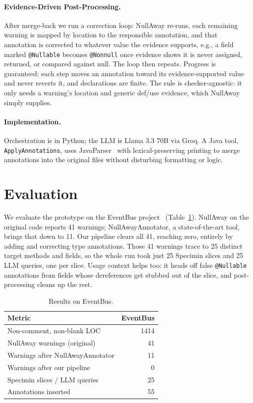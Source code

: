 \documentclass[sigplan,screen]{acmart}
\begin{document}
\paragraph{Evidence-Driven Post-Processing.}
After merge-back we run a correction loop: NullAway re-runs, each remaining warning is mapped by location to the responsible annotation, and that annotation is corrected to whatever value the evidence supports, e.g., a field marked \texttt{@Nullable} becomes \texttt{@Nonnull} once evidence shows it is never assigned, returned, or compared against null. The loop then repeats. Progress is guaranteed: each step moves an annotation toward its evidence-supported value and never reverts it, and declarations are finite. The rule is checker-agnostic: it only needs a warning's location and generic def/use evidence, which NullAway simply supplies.

\paragraph{Implementation.}
Orchestration is in Python; the LLM is Llama 3.3 70B via Groq. A Java tool, \texttt{ApplyAnnotations}, uses JavaParser~\cite{hosseini2013javaparser} with lexical-preserving printing to merge annotations into the original files without disturbing formatting or logic.

\section{Evaluation}

We evaluate the prototype on the EventBus project~\cite{eventbus} (Table~\ref{tab:results}). NullAway on the original code reports 41 warnings; NullAwayAnnotator, a state-of-the-art tool, brings that down to 11. Our pipeline clears all 41, reaching zero, entirely by adding and correcting type annotations. Those 41 warnings trace to 25 distinct target methods and fields, so the whole run took just 25 Specimin slices and 25 LLM queries, one per slice. Usage context helps too: it heads off false \texttt{@Nullable} annotations from fields whose dereferences get stubbed out of the slice, and post-processing cleans up the rest.

\begin{table}[t]
  \small
  \caption{Results on EventBus.}
  \label{tab:results}
  \begin{tabular}{lr}
    \toprule
    Metric & EventBus \\
    \midrule
    Non-comment, non-blank LOC      & 1414 \\
    NullAway warnings (original)    & 41  \\
    Warnings after NullAwayAnnotator &  11           \\
    Warnings after our pipeline     & 0            \\
    Specimin slices / LLM queries   & 25  \\
    Annotations inserted            & 55  \\
    \bottomrule
  \end{tabular}
\end{table}
\end{document}
